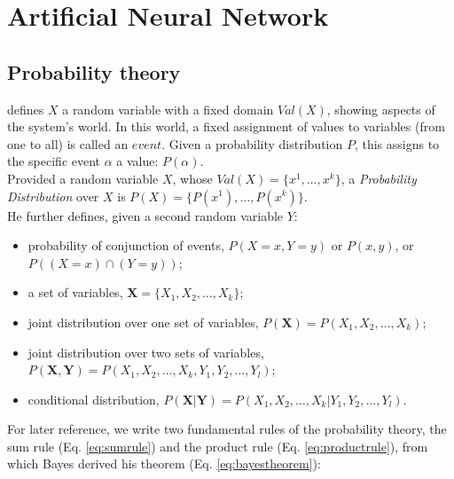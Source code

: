 
\chapter{Artificial Neural Network}
\label{cap:ann}

\section{Probability theory}
\label{sec:probability}

\citet{RefWorks:194} defines $X$ a random variable with a fixed domain $Val(X)$,
showing aspects of the system's world. In this world, a fixed assignment of
values to variables (from one to all) is called an $event$.
Given a probability distribution $P$, this assigns to the specific event
$\alpha$ a value: $P(\alpha)$.\\
Provided a random variable $X$, whose $Val(X) = \{ x^1, \ldots , x^k \}$, a
\textit{Probability Distribution} over $X$ is $P(X) = \{ P(x^1), \ldots , P(x^k)
\}$.\\
He further defines, given a second random variable $Y$:
\begin{itemize}
  \item {probability of conjunction of events, $P(X = x, Y = y)$ or $P(x, y)$,
  or $P((X = x) \cap (Y = y))$;}
  \item {a set of variables, $\mathbf{X} = \{X_1, X_2, \ldots , X_k \}$;}
  \item {joint distribution over one set of variables, $P(\mathbf{X}) =
  P(X_1, X_2, \ldots , X_k) $;}
  \item {joint distribution over two sets of variables, $P(\mathbf{X, Y}) =
  P(X_1, X_2, \ldots , X_k, Y_1, Y_2, \ldots , Y_l  ) $;}
  \item {conditional distribution, $P(\mathbf{X | Y}) =
  P(X_1, X_2, \ldots , X_k | Y_1, Y_2, \ldots , Y_l  ) $.}
\end{itemize}

For later reference, we write two fundamental rules of the probability theory,
the sum rule (Eq. \ref{eq:sumrule}) and the product rule (Eq.
\ref{eq:productrule}), from which Bayes derived his theorem (Eq.
\ref{eq:bayestheorem}):




